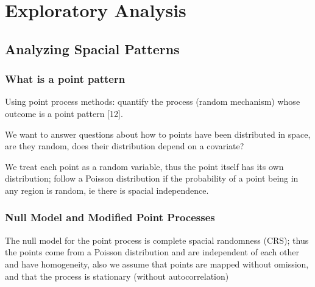 
\chapter{Exploratory Analysis} %

\label{Chapter2} %




\section{Analyzing Spacial Patterns}

\subsection{What is a point pattern}
Using point process methods: quantify the process (random mechanism) whose outcome is a point pattern [12]. \newline

We want to answer questions about how to points have been distributed in space, are they random, does their distribution depend on a covariate? \newline

We treat each point as a random variable, thus the point itself has its own distribution; follow a Poisson distribution if the probability of a point being in any region is random, ie there is spacial independence. \newline

\subsection{Null Model and Modified Point Processes}
The null model for the point process is complete spacial randomness (CRS); thus the points come from a Poisson distribution and are independent of each other and have homogeneity, also we assume that points are mapped without omission, and that the process is stationary (without autocorrelation) \newline

